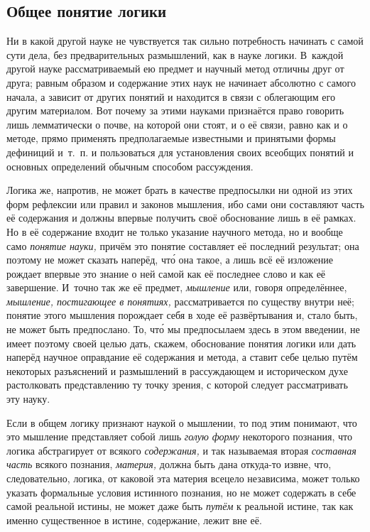 \subsection[Общее понятие логики]{Общее понятие логики}
Ни в какой другой науке не чувствуется так
сильно потребность начинать с самой сути дела, без предварительных
размышлений, как в науке логики. В~каждой другой науке рассматриваемый ею
предмет и научный метод отличны друг от друга; равным образом и содержание
этих наук не начинает абсолютно с самого начала, а зависит от других
понятий и находится в связи с облегающим его другим материалом. Вот почему за этими
науками признаётся право говорить лишь
лемматически о почве, на которой они стоят, и о её связи, равно как и о
методе, прямо применять предполагаемые известными и
принятыми формы дефиниций и~т.~п. и пользоваться для установления своих
всеобщих понятий и основных определений обычным способом рассуждения.

Логика же, напротив, не может брать в качестве предпосылки ни одной из этих
форм рефлексии или правил и законов мышления, ибо сами они составляют часть
её содержания и должны впервые получить своё обоснование лишь в её рамках.
Но в её содержание входит не только указание научного метода, но и вообще
само {\em понятие науки,} причём это понятие
составляет её последний результат; она поэтому не может сказать наперёд,
чт\'{о} она такое, а лишь всё её изложение рождает впервые это знание о ней
самой как её последнее слово и как её завершение. И~точно так же её
предмет, {\em мышление} или, говоря определённее,
{\em мышление, постигающее в понятиях,} рассматривается
по существу внутри неё; понятие этого мышления порождает себя в ходе её
развёртывания и, стало быть, не может быть предпослано. То, чт\'{о} мы
предпосылаем здесь в этом введении, не имеет поэтому своей целью дать,
скажем, обоснование понятия логики или дать наперёд научное оправдание её
содержания и метода, а ставит себе целью путём некоторых разъяснений и
размышлений в рассуждающем и историческом духе растолковать представлению
ту точку зрения, с которой следует рассматривать эту науку.

Если в общем логику признают наукой о мышлении, то под этим понимают, что
это мышление представляет собой лишь {\em голую форму}
некоторого познания, что логика абстрагирует от всякого
{\em содержания,} и так называемая вторая
{\em составная часть} всякого познания,
{\em материя,} должна быть дана откуда-то извне, что,
следовательно, логика, от каковой эта материя всецело независима, может
только указать формальные условия истинного познания, но не может содержать
в себе самой реальной истины, не может даже быть
{\em путём} к реальной истине, так как именно
существенное в истине, содержание, лежит вне её.

